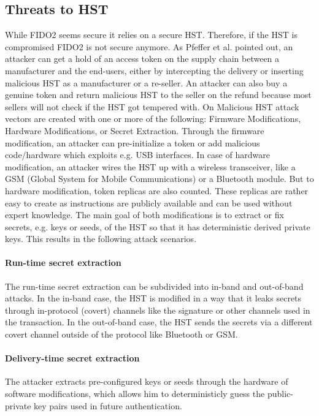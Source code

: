 \documentclass[runningheads]{llncs}
\begin{document}
\subsection{Threats to HST}
While FIDO2 seems secure it relies on a secure HST. Therefore, if the HST is compromised FIDO2 is not secure anymore. As Pfeffer et al. pointed out, an attacker can get a hold of an access token on the supply chain between a manufacturer and the end-users, either by intercepting the delivery or inserting malicious HST as a manufacturer or a re-seller. An attacker can also buy a genuine token and return malicious HST to the seller on the refund because most sellers will not check if the HST got tempered with. On Malicious HST attack vectors are created with one or more of the following: Firmware Modifications, Hardware Modifications, or Secret Extraction. Through the firmware modification, an attacker can pre-initialize a token or add malicious code/hardware which exploits e.g. USB interfaces. In case of hardware modification, an attacker wires the HST up with a wireless transceiver, like a GSM (Global System for Mobile Communications) or a Bluetooth module. But to hardware modification, token replicas are also counted. These replicas are rather easy to create as instructions are publicly available and can be used without expert knowledge. The main goal of both modifications is to extract or fix secrets, e.g. keys or seeds, of the HST so that it has deterministic derived private keys. \cite{272198} This results in the following attack scenarios.

\paragraph{Run-time secret extraction}
The run-time secret extraction can be subdivided into in-band and out-of-band attacks. In the in-band case, the HST is modified in a way that it leaks secrets through in-protocol (covert) channels like the signature or other channels used in the transaction. In the out-of-band case, the HST sends the secrets via a different covert channel outside of the protocol like Bluetooth or GSM.

\paragraph{Delivery-time secret extraction}
The attacker extracts pre-configured keys or seeds through the hardware of software modifications, which allows him to deterministicly guess the public-private key pairs used in future authentication.
\end{document}
